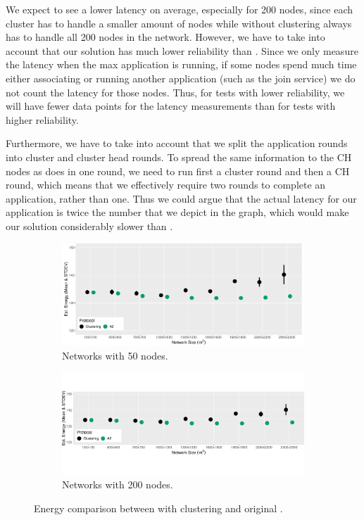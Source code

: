 We expect to see a lower latency on average, especially for 200 nodes, since each cluster has to handle a smaller amount of nodes while \atwo{} without clustering always has to handle all 200 nodes in the network. However, we have to take into account that our solution has much lower reliability than \atwo{}. Since we only measure the latency when the max application is running, if some nodes spend much time either associating or running another application (such as the join service) we do not count the latency for those nodes. Thus, for tests with lower reliability, we will have fewer data points for the latency measurements than for tests with higher reliability.

Furthermore, we have to take into account that we split the application rounds into cluster and cluster head rounds. To spread the same information to the CH nodes as \atwo{} does in one round, we need to run first a cluster round and then a CH round, which means that we effectively require two rounds to complete an application, rather than one. Thus we could argue that the actual latency for our application is twice the number that we depict in the graph, which would make our solution considerably slower than \atwo{}.

\begin{figure}[bt]
    \centering
    \begin{subfigure}{0.7\textwidth}
        \centering
        \includegraphics[width=\textwidth]{figure/Results/ChaosComparison/ChaosComparison_50_Energy.pdf}
        \caption{Networks with 50 nodes.}
        \label{subfig:energy-50-nodes}
    \end{subfigure}
    \hfill
    \begin{subfigure}{0.7\textwidth}
        \centering
        \includegraphics[width=\textwidth]{figure/Results/ChaosComparison/ChaosComparison_200_Energy.pdf}
        \caption{Networks with 200 nodes.}
        \label{subfig:energy-200-nodes}
    \end{subfigure}
    \caption{Energy comparison between \atwo{} with clustering and original \atwo{}.}
    \label{fig:energy-results}
\end{figure}


